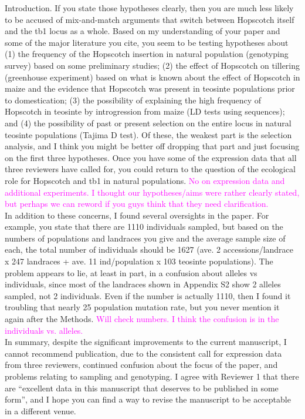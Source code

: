 \documentclass[11pt]{article}
\newcommand{\lev}[1]{\noindent \textcolor{magenta}{{#1}} \\}
\begin{document}
Introduction.  If you state those hypotheses clearly, then you are much less likely to be accused of mix-and-match arguments that switch between Hopscotch itself and the tb1 locus as a whole.  Based on my understanding of your paper and some of the major literature you cite, you seem to be testing hypotheses about (1) the frequency of the Hopscotch insertion in natural population (genotyping survey) based on some preliminary studies; (2) the effect of Hopscotch on tillering (greenhouse experiment) based on what is known about the effect of Hopscotch in maize and the evidence that Hopscotch was present in teosinte populations prior to domestication; (3) the possibility of explaining the high frequency of Hopscotch in teosinte by introgression from maize (LD tests using sequences); and (4) the possibility of past or present selection on the entire locus in natural teosinte populations (Tajima D test).  Of these, the weakest part is the selection analysis, and I think you might
be better off dropping that part and just focusing on the first three hypotheses.  Once you have some of the expression data that all three reviewers have called for, you could return to the question of the ecological role for Hopscotch and tb1 in natural populations.
\lev{No on expression data and additional experiments. I thought our hypotheses/aims were rather clearly stated, but perhaps we can reword if you guys think that they need clarification.}
    In addition to these concerns, I found several oversights in the paper.  For example, you state that there are 1110 individuals sampled, but based on the numbers of populations and landraces you give and the average sample size of each, the total number of individuals should be 1627 (ave. 2 accessions/landrace x 247 landraces + ave. 11 ind/population x 103 teosinte populations).  The problem appears to lie, at least in part, in a confusion about alleles vs individuals, since most of the landraces shown in Appendix S2 show 2 alleles sampled, not 2 individuals.  Even if the number is actually 1110, then I found it troubling that nearly 25%
population mutation rate, but you never mention it again after the Methods.
\lev{Will check numbers. I think the confusion is in the individuals vs. alleles.}
    In summary, despite the significant improvements to the current manuscript, I cannot recommend publication, due to the consistent call for expression data from three reviewers, continued confusion about the focus of the paper, and problems relating to sampling and genotyping.  I agree with Reviewer 1 that there are “excellent data in this manuscript that deserves to be published in some form”, and I hope you can find a way to revise the manuscript to be acceptable in a different venue.
\end{document}
